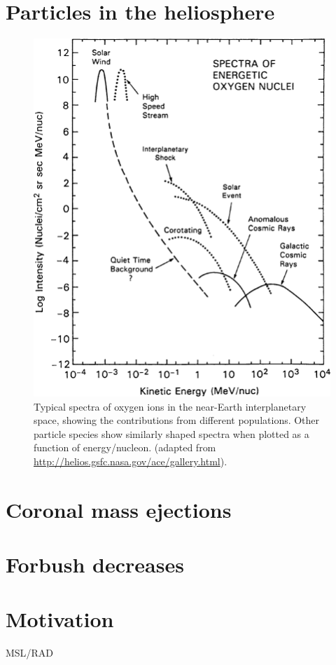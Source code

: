 
\section{Particles in the heliosphere}

\begin{figure}
	\centering
	\includegraphics[width=0.6\linewidth]{images/heliospheric_energy_spectrum}
	\caption[Spectra of oxygen ions in the near-Earth interplanetary space]{Typical spectra of oxygen ions in the near-Earth interplanetary space, showing the contributions from different populations. Other particle species show similarly shaped spectra when plotted as a function of energy/nucleon. (adapted from \url{http://helios.gsfc.nasa.gov/ace/gallery.html}).}
	\label{fig:heliospheric_energy_spectrum}
\end{figure}

\section{Coronal mass ejections}

\section{Forbush decreases}

\section{Motivation}

\ac{MSL}/\ac{RAD}